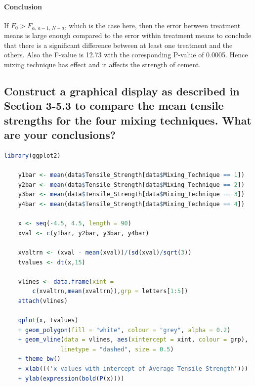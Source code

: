 \documentclass[11pt]{article}
\begin{document}
\paragraph{Conclusion}
If $\displaystyle F_{0}>F_{\alpha ,\,a-1,\,N-a}$, which is the case here, then the error between treatment means is large enough compared to the error within treatment means to conclude that there is a significant difference between at least one treatment and the others. Also the F-value is 12.73 with the coresponding P-value of 0.0005. Hence mixing technique has effect and it affects the strength of cement.

\subsection{Construct a graphical display as described in Section 3-5.3 to compare the mean tensile strengths for the four mixing techniques. What are your conclusions?}


\begin{lstlisting}[language=R]
    library(ggplot2)

    y1bar <- mean(data$Tensile_Strength[data$Mixing_Technique == 1])
    y2bar <- mean(data$Tensile_Strength[data$Mixing_Technique == 2])
    y3bar <- mean(data$Tensile_Strength[data$Mixing_Technique == 3])
    y4bar <- mean(data$Tensile_Strength[data$Mixing_Technique == 4])
    
    x <- seq(-4.5, 4.5, length = 90)
    xval <- c(y1bar, y2bar, y3bar, y4bar)
    
    xvaltrn <- (xval - mean(xval))/(sd(xval)/sqrt(3))
    tvalues <- dt(x,15)
    
    vlines <- data.frame(xint = 
        c(xvaltrn,mean(xvaltrn)),grp = letters[1:5])
    attach(vlines)
  
    qplot(x, tvalues) 
    + geom_polygon(fill = "white", colour = "grey", alpha = 0.2)  
    + geom_vline(data = vlines, aes(xintercept = xint, colour = grp), 
                linetype = "dashed", size = 0.5) 
    + theme_bw() 
    + xlab((('x values with intercept of Average Tensile Strength'))) 
    + ylab(expression(bold(P(x))))

\end{lstlisting}
\end{document}
